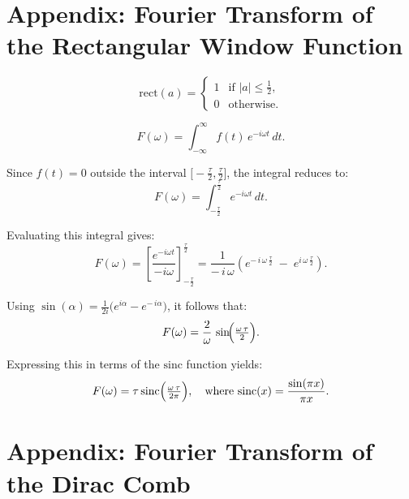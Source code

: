 

\section*{Appendix: Fourier Transform of the Rectangular Window Function}

\begin{equation}
\text{rect}(a) = 
\begin{cases}
1 & \text{if } |a| \leq \frac{1}{2}, \\
0 & \text{otherwise.}
\end{cases}
\end{equation}

\begin{equation}
F(\omega) = \int_{-\infty}^{\infty} f(t)\, e^{-i \omega t} \, dt.
\end{equation}

Since \( f(t) = 0 \) outside the interval \(\bigl[-\tfrac{\tau}{2}, \tfrac{\tau}{2}\bigr]\), the integral reduces to:
\begin{equation}
F(\omega) 
= \int_{-\frac{\tau}{2}}^{\frac{\tau}{2}} e^{-i \omega t} \, dt.
\end{equation}

Evaluating this integral gives:
\begin{equation}
F(\omega) 
= \left[ \frac{e^{-i \omega t}}{-i \omega} \right]_{-\frac{\tau}{2}}^{\frac{\tau}{2}}
= \frac{1}{-\,i\,\omega} 
\left( e^{-\,i\,\omega \,\frac{\tau}{2}} \;-\; e^{i\,\omega \,\frac{\tau}{2}} \right).
\end{equation}

Using 
\(\sin(\alpha) = \tfrac{1}{2i}\bigl(e^{i\alpha} - e^{-\,i\alpha}\bigr)\), it follows that:
\begin{equation}
F(\omega) 
= \frac{2}{\omega} \,\sin\!\Bigl(\tfrac{\omega \,\tau}{2}\Bigr).
\end{equation}

Expressing this in terms of the \(\mathrm{sinc}\) function yields:
\begin{equation}
F(\omega) 
= \tau \,\mathrm{sinc}\Bigl(\tfrac{\omega\,\tau}{2\pi}\Bigr),
\quad \text{where } 
\mathrm{sinc}(x) = \frac{\sin(\pi x)}{\pi x}.
\end{equation}

\section*{Appendix: Fourier Transform of the Dirac Comb}

